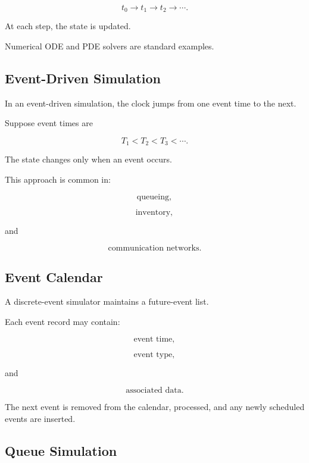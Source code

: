 \[
\boxed{
t_0
\rightarrow
t_1
\rightarrow
t_2
\rightarrow
\cdots.
}
\]

At each step, the state is updated.

Numerical ODE and PDE solvers are standard examples.

\subsection{Event-Driven Simulation}
\label{subsec:event-driven-simulation}

In an event-driven simulation, the clock jumps from one event time to the
next.

Suppose event times are

\[
\boxed{
T_1<T_2<T_3<\cdots.
}
\]

The state changes only when an event occurs.

This approach is common in:

\[
\boxed{
\text{queueing},
}
\]

\[
\boxed{
\text{inventory},
}
\]

and

\[
\boxed{
\text{communication networks}.
}
\]

\subsection{Event Calendar}
\label{subsec:event-calendar}

A discrete-event simulator maintains a future-event list.

Each event record may contain:

\[
\boxed{
\text{event time},
}
\]

\[
\boxed{
\text{event type},
}
\]

and

\[
\boxed{
\text{associated data}.
}
\]

The next event is removed from the calendar, processed, and any newly
scheduled events are inserted.

\subsection{Queue Simulation}
\label{subsec:queue-simulation}

